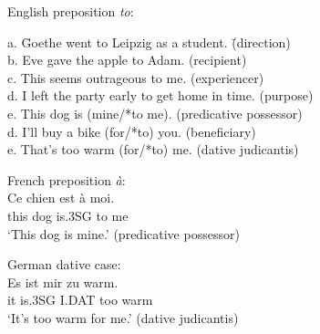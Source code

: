 \ea
English preposition {\em to}:
\label{e:to-dative}
\begin{tabbing}
a. \hspace{0,3cm}    \= Goethe went to Leipzig as a student.  \hspace{1cm} \= (direction)\\
b. \> Eve gave the apple to Adam. \> (recipient)\\
c. \> This seems outrageous to me. \> (experiencer)\\
d. \> I left the party early to get home in time. \> (purpose)\\
e. \> This dog is (mine/*to me). \> (predicative possessor)\\
d. \> I'll buy a bike (for/*to) you. \> (beneficiary) \\
e. \> That's too warm (for/*to) me. \> (dative judicantis)\\
\end{tabbing}
\item French preposition {\em \`{a}}:
\\
\gll Ce chien est \`{a} moi.\\
this dog is.3SG to me\\
\glt `This dog is mine.' (predicative possessor)\\

\item German dative case:
\\
\gll Es ist mir zu warm.\\
it is.3SG I.DAT too warm\\
\glt `It's too warm for me.' (dative judicantis)\\
\z

